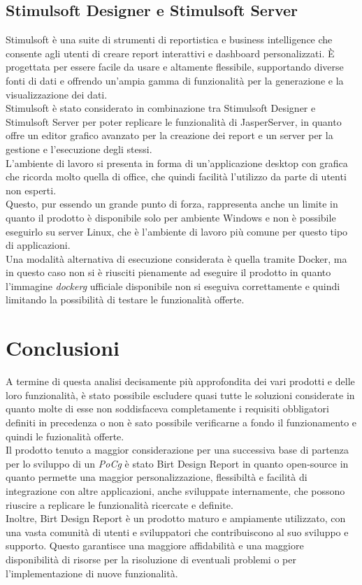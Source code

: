     \subsection{Stimulsoft Designer e Stimulsoft Server}
    \label{sec:Stimulsoft}
    Stimulsoft è una suite di strumenti di reportistica e business intelligence che consente agli utenti di creare report interattivi e dashboard personalizzati. È progettata per essere facile da usare e altamente flessibile, supportando diverse fonti di dati e offrendo un'ampia gamma di funzionalità per la generazione e la visualizzazione dei dati.\\
    Stimulsoft è stato considerato in combinazione tra Stimulsoft Designer e Stimulsoft Server per poter replicare le funzionalità di JasperServer, in quanto offre un editor grafico avanzato per la creazione dei report e un server per la gestione e l'esecuzione degli stessi.\\
    L'ambiente di lavoro si presenta in forma di un'applicazione desktop con grafica che ricorda molto quella di office, che quindi facilità l'utilizzo da parte di utenti non esperti.\\
    Questo, pur essendo un grande punto di forza, rappresenta anche un limite in quanto il prodotto è disponibile solo per ambiente Windows e non è possibile eseguirlo su server Linux, che è l'ambiente di lavoro più comune per questo tipo di applicazioni.\\
    Una modalità alternativa di esecuzione considerata è quella tramite Docker, ma in questo caso non si è riusciti pienamente ad eseguire il prodotto in quanto l'immagine \emph{\gls{dockerg}} ufficiale disponibile non  si eseguiva correttamente e quindi limitando la possibilità di testare le funzionalità offerte.\\

\section{Conclusioni}
\label{sec:conclusioni}
    A termine di questa analisi decisamente più approfondita dei vari prodotti e delle loro funzionalità, è stato possibile escludere quasi tutte le soluzioni considerate in quanto molte di esse non soddisfaceva completamente i requisiti obbligatori definiti in precedenza o non è sato possibile verificarne a fondo il funzionamento e quindi le fuzionalità offerte.\\
    Il prodotto tenuto a maggior considerazione per una successiva base di partenza per lo sviluppo di un \emph{\gls{PoCg}} è stato Birt Design Report in quanto open-source in quanto permette una maggior personalizzazione, flessibiltà e facilità di integrazione con altre applicazioni, anche sviluppate internamente, che possono riuscire a replicare le funzionalità ricercate e definite.\\
    Inoltre, Birt Design Report è un prodotto maturo e ampiamente utilizzato, con una vasta comunità di utenti e sviluppatori che contribuiscono al suo sviluppo e supporto. Questo garantisce una maggiore affidabilità e una maggiore disponibilità di risorse per la risoluzione di eventuali problemi o per l'implementazione di nuove funzionalità.\\
